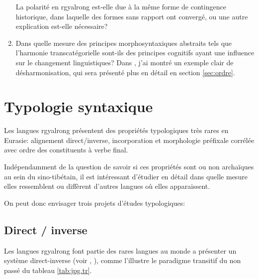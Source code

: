 \documentclass[oldfontcommands,oneside,a4paper,11pt]{memoir}
\begin{document}
\begin{enumerate}
La polarité en rgyalrong est-elle due à la même forme de contingence historique, dans laquelle des formes sans rapport ont convergé, ou une autre explication est-elle nécessaire?

\item Dans quelle mesure des principes morphosyntaxiques abstraits tels que l'harmonie transcatégorielle sont-ils des principes cognitifs ayant une influence sur le changement linguistiques? Dans \citet{jacques13harmonization}, j'ai montré un exemple clair de désharmonisation, qui sera présenté plus en détail en section \ref{sec:ordre}.

\end{enumerate}

\chapter{Typologie syntaxique} \label{chap:typologie}
Les langues rgyalrong présentent des propriétés typologiques très rares en Eurasie: alignement direct/inverse, incorporation et morphologie préfixale corrélée avec ordre des constituents à  verbe final.

Indépendamment de la question de savoir si ces propriétés sont ou non archaïques au sein du sino-tibétain, il est intéressant d'étudier en détail dans quelle mesure elles ressemblent ou diffèrent d'autres langues où elles apparaissent.


On peut donc envisager trois projets d'études typologiques:

\section{Direct / inverse}
Les langues rgyalrong font partie des rares langues au monde a présenter un système direct-inverse (voir \citealt{jacques10inverse}, \citealt{gongxun12}), comme l'illustre le paradigme transitif du non passé du tableau \ref{tab:jpg.tr}.
\end{document}
